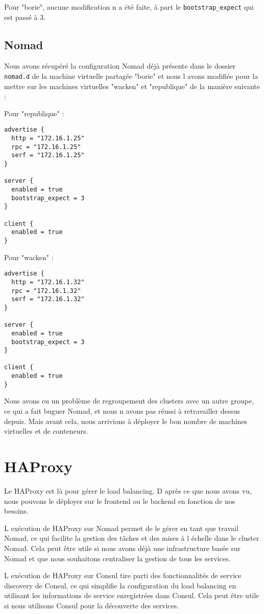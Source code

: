\documentclass{report}
\begin{document}
Pour "borie", aucune modification n a été faite, à part le \texttt{bootstrap\_expect} qui est passé à 3.

\section{Nomad}
Nous avons récupéré la configuration Nomad déjà présente dans le dossier \texttt{nomad.d} de la machine virtuelle partagée "borie" et nous l avons modifiée pour la mettre sur les machines virtuelles "wacken" et "republique" de la manière suivante :

\newpage
Pour "republique" :
\begin{verbatim}
advertise {
  http = "172.16.1.25"
  rpc = "172.16.1.25"
  serf = "172.16.1.25"
}

server {
  enabled = true
  bootstrap_expect = 3
}

client {
  enabled = true
}
\end{verbatim}

Pour "wacken" :
\begin{verbatim}
advertise {
  http = "172.16.1.32"
  rpc = "172.16.1.32"
  serf = "172.16.1.32"
}

server {
  enabled = true
  bootstrap_expect = 3
}

client {
  enabled = true
}
\end{verbatim}

Nous avons eu un problème de regroupement des clusters avec un autre groupe, ce qui a fait buguer Nomad, et nous n avons pas réussi à retravailler dessus depuis. Mais avant cela, nous arrivions à déployer le bon nombre de machines virtuelles et de conteneurs.

\newpage

\chapter{HAProxy}
Le HAProxy est là pour gérer le load balancing. D après ce que nous avons vu, nous pouvons le déployer sur le frontend ou le backend en fonction de nos besoins.

L exécution de HAProxy sur Nomad permet de le gérer en tant que travail Nomad, ce qui facilite la gestion des tâches et des mises à l échelle dans le cluster Nomad. Cela peut être utile si nous avons déjà une infrastructure basée sur Nomad et que nous souhaitons centraliser la gestion de tous les services.

L exécution de HAProxy sur Consul tire parti des fonctionnalités de service discovery de Consul, ce qui simplifie la configuration du load balancing en utilisant les informations de service enregistrées dans Consul. Cela peut être utile si nous utilisons Consul pour la découverte des services.
\end{document}
